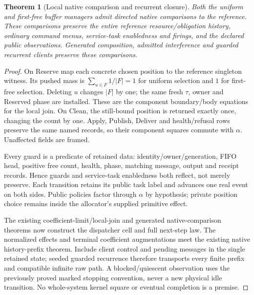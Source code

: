 \documentclass[11pt]{article}
\newtheorem{theorem}{Theorem}
\begin{document}
\begin{theorem}[Local native comparison and recurrent closure]\label{thm:resource-native}
Both the uniform and first-free buffer managers admit directed native comparisons to the reference. These comparisons preserve the entire reference resource/obligation history, ordinary command menus, service-task enabledness and firings, and the declared public observations. Generated composition, admitted interference and guarded recurrent clients preserve these comparisons.
\end{theorem}
\begin{proof}
On Reserve map each concrete chosen position to the reference singleton witness. Its pushed mass is $\sum_{u\in F}1/|F|=1$ for uniform selection and $1$ for first-free selection. Deleting $u$ changes $|F|$ by one; the same fresh $\tau$, owner and Reserved phase are installed. These are the component boundary/body equations for the local join. On Clean, the still-bound position is returned exactly once, changing the count by one. Apply, Publish, Deliver and health/refusal rows preserve the same named records, so their component squares commute with $\alpha$. Unaffected fields are framed.

Every guard is a predicate of retained data: identity/owner/generation, FIFO head, positive free count, health, phase, matching message, output and receipt records. Hence guards and service-task enabledness both reflect, not merely preserve. Each transition retains its public task label and advances one real event on both sides. Public policies factor through $\alpha$ by hypothesis; private position choice remains inside the allocator's supplied primitive effect.

The existing coefficient-limit/local-join and generated native-comparison theorems now construct the dispatcher cell and full next-step law. The normalized effects and terminal coefficient augmentations meet the existing native history-prefix theorem. Include client control and pending messages in the single retained state; seeded guarded recurrence therefore transports every finite prefix and compatible infinite raw path. A blocked/quiescent observation uses the previously proved marked stopping convention, never a new physical idle transition. No whole-system kernel square or eventual completion is a premise.
\end{proof}
\end{document}
